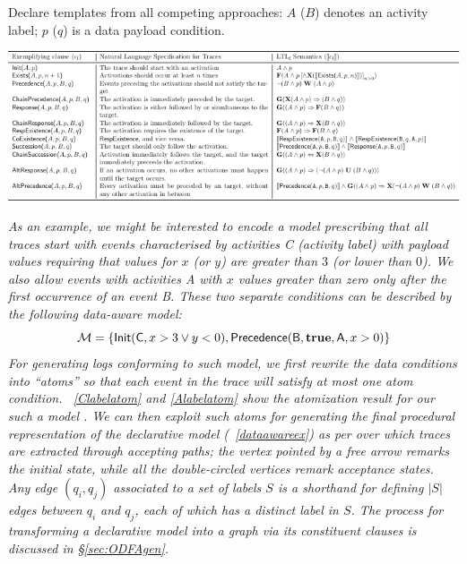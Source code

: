 \documentclass[sigconf]{acmart}
\begin{document}
\begin{table}[!t]
	\centering
\caption{Declare \textsf{templates} from all competing approaches: $A$ ($B$) denotes an activity label; $p$ ($q$) is a data payload condition.}\label{tab:dt}
\includegraphics[scale=1.4]{fig/tabdecl}
\end{table} 

\textit{As an example, we might be interested to encode a model prescribing that all traces start with events characterised by activities \textsc{C} (activity label) with payload values requiring that values for $x$ (or $y$) are greater than $3$ (or lower than $0$). We also allow events with activities \textsf{A} with $x$ values greater than zero only after the first occurrence of an event \textsf{B}. These two separate conditions can be described by the following data-aware model:}
\begin{equation}\label{eq:moddataaw}
\mathcal{M}=\{\textsf{Init}({\normalfont \textsf{C}},x>3\vee y< 0 ),\textsf{Precedence}({\normalfont \textsf{B}},\textbf
{true}, {\normalfont \textsf{A}},x>0)\}
\end{equation}
\textit{For generating logs conforming to such model, we first rewrite the data conditions into ``atoms'' so that each event in the trace will satisfy at most one atom condition. \tablename~\ref{Clabelatom} and \ref{Alabelatom} show the atomization result for our such a model \cite{info14030173}. We can then exploit such atoms for generating the final procedural representation of the declarative model (\figurename~\ref{dataawareex}) as per \cite{DBLP:conf/bpm/BergamiMMM21} over which traces are extracted through accepting paths; the vertex pointed by a free arrow remarks the initial state, while all the double-circled vertices remark acceptance states. Any edge $(q_i,q_j)$ associated to a set of labels $S$ is a shorthand for defining $|S|$ edges between $q_i$ and $q_j$, each of which has a distinct label in $S$. The process for transforming a declarative model into a graph via its constituent clauses is discussed in \S\ref{sec:ODFAgen}.}
\end{document}

